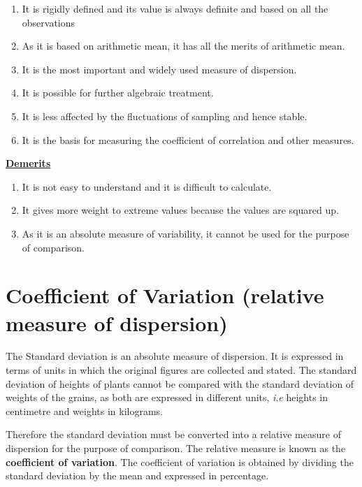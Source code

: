 \documentclass[
]{book}
\begin{document}
\begin{enumerate}
\def\labelenumi{\arabic{enumi}.}
\item
  It is rigidly defined and its value is always definite and based on
  all the observations
\item
  As it is based on arithmetic mean, it has all the merits of
  arithmetic mean.
\item
  It is the most important and widely used measure of dispersion.
\item
  It is possible for further algebraic treatment.
\item
  It is less affected by the fluctuations of sampling and hence
  stable.
\item
  It is the basis for measuring the coefficient of correlation and
  other measures.
\end{enumerate}

\textbf{\underline{Demerits}}

\begin{enumerate}
\def\labelenumi{\arabic{enumi}.}
\item
  It is not easy to understand and it is difficult to calculate.
\item
  It gives more weight to extreme values because the values are
  squared up.
\item
  As it is an absolute measure of variability, it cannot be used for
  the purpose of comparison.
\end{enumerate}

\hypertarget{coefficient-of-variation-relative-measure-of-dispersion}{%
\section{Coefficient of Variation (relative measure of dispersion)}\label{coefficient-of-variation-relative-measure-of-dispersion}}

The Standard deviation is an absolute measure of dispersion. It is
expressed in terms of units in which the original figures are collected
and stated. The standard deviation of heights of plants cannot be
compared with the standard deviation of weights of the grains, as both
are expressed in different units, \emph{i}.\emph{e} heights in centimetre and
weights in kilograms.

Therefore the standard deviation must be converted into a relative
measure of dispersion for the purpose of comparison. The relative
measure is known as the \textbf{coefficient of variation}. The coefficient of
variation is obtained by dividing the standard deviation by the mean and
expressed in percentage.
\end{document}

